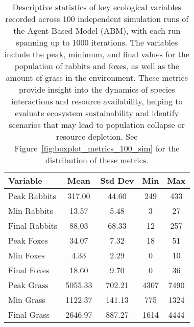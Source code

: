 \begin{table}[h!]
    \centering
    \begin{tabular}{lcccc}
    \hline
    \textbf{Variable} & \textbf{Mean} & \textbf{Std Dev} & \textbf{Min} & \textbf{Max} \\
    \hline
    Peak Rabbits     & 317.00 & 44.60  & 249   & 433  \\
    Min Rabbits      & 13.57  & 5.48   & 3     & 27   \\
    Final Rabbits    & 88.03  & 68.33  & 12    & 257  \\
    Peak Foxes       & 34.07  & 7.32   & 18    & 51   \\
    Min Foxes        & 4.33   & 2.29   & 0     & 10   \\
    Final Foxes      & 18.60  & 9.70   & 0     & 36   \\
    Peak Grass       & 5055.33 & 702.21 & 4307  & 7490 \\
    Min Grass        & 1122.37 & 141.13 & 775   & 1324 \\
    Final Grass      & 2646.97 & 887.27 & 1614  & 4444 \\
    \hline
    \end{tabular}
    \caption{
        Descriptive statistics of key ecological variables recorded across 100 independent simulation runs of the Agent-Based Model (ABM), with each run spanning up to 1000 iterations. The variables include the peak, minimum, and final values for the population of rabbits and foxes, as well as the amount of grass in the environment. These metrics provide insight into the dynamics of species interactions and resource availability, helping to evaluate ecosystem sustainability and identify scenarios that may lead to population collapse or resource depletion. See Figure~\ref{fig:boxplot_metrics_100_sim} for the distribution of these metrics.
    }
    \label{tab:simulation_stats_2.1}
\end{table}
